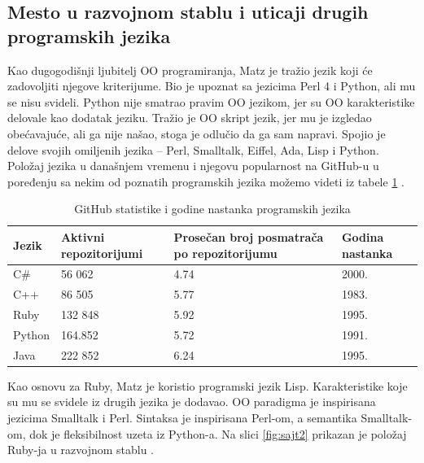 \documentclass[a4paper]{article}
\begin{document}
\subsection{Mesto u razvojnom stablu i uticaji drugih programskih jezika}

Kao dugogodišnji ljubitelj OO programiranja, Matz je tražio jezik koji će zadovoljiti njegove kriterijume. Bio je upoznat sa jezicima Perl 4 i Python, ali mu se nisu svideli. Python nije smatrao pravim OO jezikom, jer su OO karakteristike delovale kao dodatak jeziku. Tražio je OO skript jezik, jer mu je izgledao obećavajuće, ali ga nije našao, stoga je odlučio da ga sam napravi. Spojio je delove svojih omiljenih jezika – Perl, Smalltalk, Eiffel, Ada, Lisp i Python. Položaj jezika u današnjem vremenu i njegovu popularnost na GitHub-u u poređenju sa nekim od poznatih programskih jezika možemo videti iz tabele \ref{tab:tabela1} \cite{rubyProgLang}.

\begin{table}[h!]
\begin{center}
\caption{GitHub statistike i godine nastanka programskih jezika}\vspace*{15pt}
\begin{tabular}{|p{1cm}|p{2cm}|p{4cm}|p{2cm}|} \hline
Jezik&Aktivni repozitorijumi&Prosečan broj posmatrača po repozitorijumu& Godina nastanka\\ \hline
C\#&56 062 &4.74&2000.\\ \hline
C++&86 505 &5.77&1983.\\ \hline
Ruby&132 848 &5.92&1995.\\ \hline
Python&164.852 &5.72&1991.\\ \hline
Java&222 852 &6.24&1995.\\ \hline
\end{tabular}
\label{tab:tabela1}
\end{center}
\end{table}
Kao osnovu za Ruby, Matz je koristio programski jezik Lisp. Karakteristike koje su mu se svidele iz drugih jezika je dodavao. OO paradigma je inspirisana jezicima Smalltalk i Perl. Sintaksa je inspirisana Perl-om, a semantika Smalltalk-om, dok je fleksibilnost uzeta iz Python-a. Na slici \ref{fig:sajt2} prikazan je položaj Ruby-ja u razvojnom stablu \cite{rubyTalk}\cite{ruby-doc}.
\end{document}
